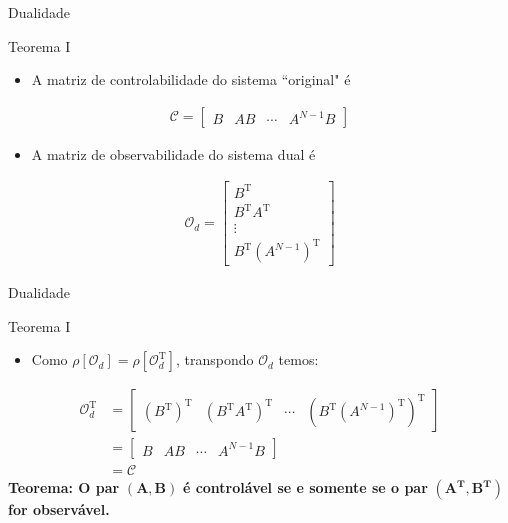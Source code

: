 \begin{frame}{Dualidade}
\begin{block}{Teorema I}
\begin{itemize}
    \item A matriz de controlabilidade do sistema ``original" é
\end{itemize}
\begin{align*}
    \mathcal{C} = \begin{bmatrix} B & AB & \cdots & A^{N-1}B \end{bmatrix}
\end{align*}
\vspace{-0.3cm}
\begin{itemize}
    \item A matriz de observabilidade do sistema dual é
\end{itemize}
\begin{align*}
    \mathcal{O}_d = \begin{bmatrix} B^\text{T} \\ B^\text{T}A^\text{T} \\ \vdots \\ B^\text{T}(A^{N-1})^\text{T} \end{bmatrix}
\end{align*}
\end{block}
\end{frame}

\begin{frame}{Dualidade}
\begin{block}{Teorema I}
\begin{itemize}
    \item Como $\rho[\mathcal{O}_d] = \rho[\mathcal{O}_d^\text{T}]$, transpondo $\mathcal{O}_d$ temos:
\end{itemize}
\begin{align*}
    \mathcal{O}_d^\text{T} &= \begin{bmatrix} (B^\text{T})^\text{T} & (B^\text{T}A^\text{T})^\text{T} & \cdots & (B^\text{T}(A^{N-1})^\text{T})^\text{T} \end{bmatrix} \\
    &= \begin{bmatrix} B & AB & \cdots & A^{N-1}B \end{bmatrix} \\
    &= \mathcal{C}
\end{align*}
\vspace{0.2cm}
\textbf{Teorema: O par} $\bm{(A,B)}$ \textbf{é controlável se e somente se o par }$\bm{(A^\text{T}, B^\text{T})}$ \textbf{for observável.}
\end{block}
\end{frame}

